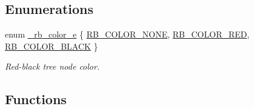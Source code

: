 \subsection*{Enumerations}
\begin{CompactItemize}
\item 
enum \hyperlink{group__dbprim__rbtree_a38}{\_\-rb\_\-color\_\-e} \{ \hyperlink{group__dbprim__rbtree_a38a138}{RB\_\-COLOR\_\-NONE}, 
\hyperlink{group__dbprim__rbtree_a38a139}{RB\_\-COLOR\_\-RED}, 
\hyperlink{group__dbprim__rbtree_a38a140}{RB\_\-COLOR\_\-BLACK}
 \}
\begin{CompactList}\small\item\em Red-black tree node color.\item\end{CompactList}\end{CompactItemize}
\subsection*{Functions}
